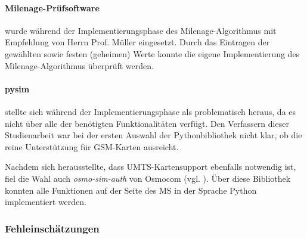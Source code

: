 			\paragraph{Milenage-Prüfsoftware} wurde während der Implementierungsphase des
			Milenage-Algorithmus mit Empfehlung von Herrn Prof. Müller eingesetzt.
			Durch das Eintragen der gewählten sowie festen (geheimen) Werte konnte
			die eigene Implementierung des Milenage-Algorithmus überprüft werden.

			\paragraph{pysim} stellte sich während der Implementierungsphase als
			problematisch heraus, da es nicht über alle der benötigten Funktionalitäten
			verfügt. Den Verfassern dieser Studienarbeit war bei der ersten Auswahl
			der Pythonbibliothek nicht klar, ob die reine Unterstützung für \ac{GSM}-Karten
			ausreicht.

			Nachdem sich herausstellte, dass \ac{UMTS}-Kartensupport ebenfalls notwendig ist, fiel die
			Wahl auch \textit{osmo-sim-auth} von Osmocom (vgl. ). Über diese Bibliothek konnten
			alle Funktionen auf der Seite des \ac{MS} in der Sprache Python implementiert werden.
		\subsubsection{Fehleinschätzungen}
\clearpage